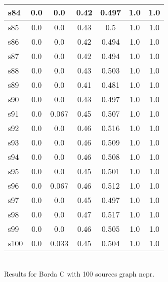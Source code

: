 \documentclass{article}
\begin{document}
\begin{tabular}{|l|c|c|c|c|c|c|}
\hline
s84 &0.0 & 0.0 & 0.42 & 0.497 & 1.0 & 1.0\\
\hline
s85 &0.0 & 0.0 & 0.43 & 0.5 & 1.0 & 1.0\\
\hline
s86 &0.0 & 0.0 & 0.42 & 0.494 & 1.0 & 1.0\\
\hline
s87 &0.0 & 0.0 & 0.42 & 0.494 & 1.0 & 1.0\\
\hline
s88 &0.0 & 0.0 & 0.43 & 0.503 & 1.0 & 1.0\\
\hline
s89 &0.0 & 0.0 & 0.41 & 0.481 & 1.0 & 1.0\\
\hline
s90 &0.0 & 0.0 & 0.43 & 0.497 & 1.0 & 1.0\\
\hline
s91 &0.0 & 0.067 & 0.45 & 0.507 & 1.0 & 1.0\\
\hline
s92 &0.0 & 0.0 & 0.46 & 0.516 & 1.0 & 1.0\\
\hline
s93 &0.0 & 0.0 & 0.46 & 0.509 & 1.0 & 1.0\\
\hline
s94 &0.0 & 0.0 & 0.46 & 0.508 & 1.0 & 1.0\\
\hline
s95 &0.0 & 0.0 & 0.45 & 0.501 & 1.0 & 1.0\\
\hline
s96 &0.0 & 0.067 & 0.46 & 0.512 & 1.0 & 1.0\\
\hline
s97 &0.0 & 0.0 & 0.45 & 0.497 & 1.0 & 1.0\\
\hline
s98 &0.0 & 0.0 & 0.47 & 0.517 & 1.0 & 1.0\\
\hline
s99 &0.0 & 0.0 & 0.46 & 0.505 & 1.0 & 1.0\\
\hline
s100 &0.0 & 0.033 & 0.45 & 0.504 & 1.0 & 1.0\\
\hline
\end{tabular}\\

\noindent Results for Borda C with 100 sources graph ncpr.
\end{document}
